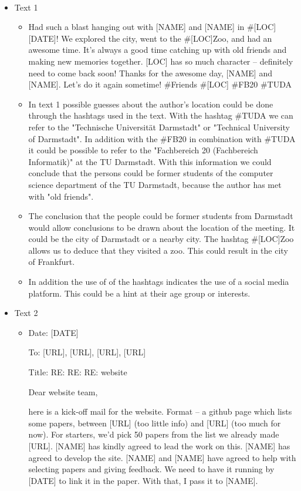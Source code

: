 \documentclass[a4 paper]{article}
\numberwithin{equation}{section}
\newcommand{\problem}[2]{~\\\fbox{\textbf{Problem #1}}\newline\newline}
\newcommand{\0}{\mathbf{0}}
\begin{document}
\pagebreak

\problem{3}{}

\begin{itemize}
    \item Text 1
    		\begin{itemize}
    			\item Had such a blast hanging out with [NAME] and [NAME] in \#[LOC] [DATE]! We explored the city, went to the \#[LOC]Zoo, and had an awesome time. It’s always a good time catching up with old friends and making new memories together. [LOC] has so much character – definitely need to come back soon! Thanks for the awesome day, [NAME] and [NAME]. Let’s do it again sometime! \#Friends \#[LOC] \#FB20 \#TUDA
    			\item In text 1 possible guesses about the author's location could be done through the hashtags used in the text. With the hashtag \#TUDA we can refer to the "Technische Universität Darmstadt" or "Technical University of Darmstadt". In addition with the \#FB20 in combination with \#TUDA it could be possible to refer to the "Fachbereich 20 (Fachbereich Informatik)" at the TU Darmstadt. With this information we could conclude that the persons could be former students of the computer science department of the TU Darmstadt, because the author has met with "old friends".
    			\item The conclusion that the people could be former students from Darmstadt would allow conclusions to be drawn about the location of the meeting. It could be the city of Darmstadt or a nearby city. The hashtag \#[LOC]Zoo allows us to deduce that they visited a zoo. This could result in the city of Frankfurt.
    			\item In addition the use of of the hashtags indicates the use of a social media platform. This could be a hint at their age group or interests.
    		\end{itemize}

    \item Text 2
        \begin{itemize}
        		\item Date: [DATE]
        
        To: [URL], [URL], [URL], [URL]
        
        Title: RE: RE: RE: website
        
        Dear website team,
        
        here is a kick-off mail for the website. Format – a github page which lists some papers, between [URL] (too little info) and [URL] (too much for now). For starters, we’d pick 50 papers from the list we already made [URL]. [NAME] has kindly agreed to lead the work on this. [NAME] has agreed to develop the site. [NAME] and [NAME] have agreed to help with selecting papers and giving feedback. We need to have it running by [DATE] to link it in the paper. With that, I pass it to [NAME].
        

\end{itemize}
\end{itemize}
\end{document}
